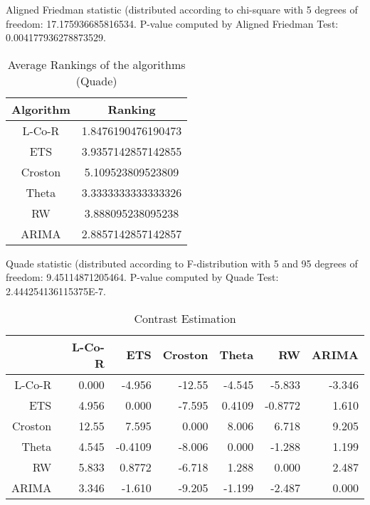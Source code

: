 \documentclass[a4paper,10pt]{article}
\begin{document}
\begin{landscape}
Aligned Friedman statistic (distributed according to chi-square with 5 degrees of freedom: 17.175936685816534. 
P-value computed by Aligned Friedman Test: 0.004177936278873529.\newline


\newpage

\begin{table}[!htp]
\centering
\caption{Average Rankings of the algorithms (Quade)
}\begin{tabular}{c|c}
Algorithm&Ranking\\
\hline
L-Co-R&1.8476190476190473\\
ETS&3.9357142857142855\\
Croston&5.109523809523809\\
Theta&3.3333333333333326\\
RW&3.888095238095238\\
ARIMA&2.8857142857142857\\
\end{tabular}
\end{table}
Quade statistic (distributed according to F-distribution with 5 and 95 degrees of freedom: 9.45114871205464. 
P-value computed by Quade Test: 2.444254136115375E-7.\newline


\newpage

\begin{table}[!htp]
\centering\tiny
\caption{Contrast Estimation}
\begin{tabular}{
|r|r|r|r|r|r|r|}
\hline
 &L-Co-R&ETS&Croston&Theta&RW&ARIMA\\
\hline
L-Co-R&0.000&-4.956&-12.55&-4.545&-5.833&-3.346\\
\hline
ETS&4.956&0.000&-7.595&0.4109&-0.8772&1.610\\
\hline
Croston&12.55&7.595&0.000&8.006&6.718&9.205\\
\hline
Theta&4.545&-0.4109&-8.006&0.000&-1.288&1.199\\
\hline
RW&5.833&0.8772&-6.718&1.288&0.000&2.487\\
\hline
ARIMA&3.346&-1.610&-9.205&-1.199&-2.487&0.000\\
\hline

\end{tabular}
\end{table}

\newpage


\end{landscape}
\end{document}
